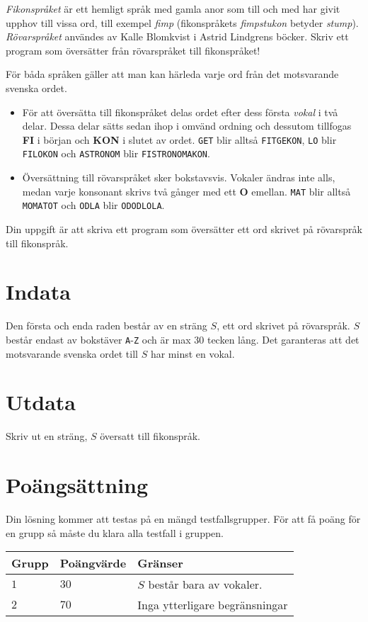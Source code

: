 \textit{Fikonspråket} är ett hemligt språk med gamla anor som till och med har givit upphov till vissa ord, 
till exempel \textit{fimp} (fikonspråkets \textit{fimpstukon} betyder \textit{stump}). 
\textit{Rövarspråket} användes av Kalle Blomkvist i Astrid Lindgrens böcker. 
Skriv ett program som översätter från rövarspråket till fikonspråket!

För båda språken gäller att man kan härleda varje ord från det motsvarande svenska ordet. 

\begin{itemize}
        \item För att översätta till fikonspråket delas ordet efter dess första \textit{vokal} i två delar. Dessa delar sätts sedan ihop i omvänd ordning och dessutom tillfogas \textbf{FI} i början och \textbf{KON} i slutet av ordet.
                \texttt{GET} blir alltså \texttt{FITGEKON}, 
                \texttt{LO} blir \texttt{FILOKON} och \texttt{ASTRONOM} blir \texttt{FISTRONOMAKON}.
        \item Översättning till rövarspråket sker bokstavsvis. 
                Vokaler ändras inte alls, medan varje konsonant skrivs två gånger med ett \textbf{O} emellan.
                \texttt{MAT} blir alltså \texttt{MOMATOT} och \texttt{ODLA} blir \texttt{ODODLOLA}.
\end{itemize}


Din uppgift är att skriva ett program som översätter ett ord skrivet på rövarspråk till fikonspråk.

\section*{Indata}
Den första och enda raden består av en sträng $S$, ett ord skrivet på rövarspråk. 
$S$ består endast av bokstäver \texttt{A}-\texttt{Z} och är max 30 tecken lång.
Det garanteras att det motsvarande svenska ordet till $S$ har minst en vokal.

\section*{Utdata}
Skriv ut en sträng, $S$ översatt till fikonspråk.

\section*{Poängsättning}
Din lösning kommer att testas på en mängd testfallsgrupper. För att få poäng för en grupp så måste du klara alla testfall i gruppen.


\noindent
\begin{tabular}{| l | l | p{12cm} |}
  \hline
  Grupp & Poängvärde & Gränser \\ \hline
  $1$   & $30$       & $S$ består bara av vokaler. \\ \hline
  $2$   & $70$       & Inga ytterligare begränsningar \\ \hline
\end{tabular}
